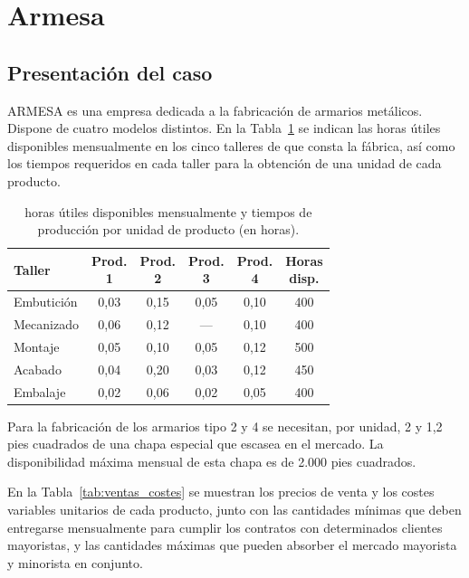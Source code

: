 \section{Armesa}

\subsection{Presentación del caso}

ARMESA es una empresa dedicada a la fabricación de armarios metálicos. 
Dispone de cuatro modelos distintos. En la Tabla~\ref{tab:horas_talleres} se indican las horas útiles disponibles mensualmente en los cinco talleres de que consta la fábrica, así como los tiempos requeridos en cada taller para la obtención de una unidad de cada producto.

\begin{table}[!h]
\centering
\caption{horas útiles disponibles mensualmente y tiempos de producción por unidad de producto (en horas).}
\label{tab:horas_talleres}
\begin{tabular}{l c c c c c}
\hline
Taller & 
\makecell{Prod.\\1} & 
\makecell{Prod.\\2} & 
\makecell{Prod.\\3} & 
\makecell{Prod.\\4} & 
\makecell{Horas\\disp.} \\ \hline
Embutición & 0,03 & 0,15 & 0,05 & 0,10 & 400 \\
Mecanizado & 0,06 & 0,12 & ---  & 0,10 & 400 \\
Montaje    & 0,05 & 0,10 & 0,05 & 0,12 & 500 \\
Acabado    & 0,04 & 0,20 & 0,03 & 0,12 & 450 \\
Embalaje   & 0,02 & 0,06 & 0,02 & 0,05 & 400 \\ \hline
\end{tabular}
\end{table}

Para la fabricación de los armarios tipo 2 y 4 se necesitan, por unidad, 2 y 1,2 pies cuadrados de una chapa especial que escasea en el mercado. La disponibilidad máxima mensual de esta chapa es de 2.000 pies cuadrados.

En la Tabla~\ref{tab:ventas_costes} se muestran los precios de venta y los costes variables unitarios de cada producto, junto con las cantidades mínimas que deben entregarse mensualmente para cumplir los contratos con determinados clientes mayoristas, y las cantidades máximas que pueden absorber el mercado mayorista y minorista en conjunto.

